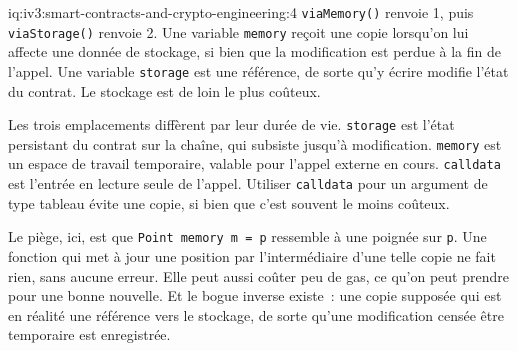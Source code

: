 \begin{solution}{iq:iv3:smart-contracts-and-crypto-engineering:4}
\texttt{viaMemory()} renvoie 1, puis \texttt{viaStorage()} renvoie 2. Une variable \texttt{memory} reçoit une copie lorsqu'on lui affecte une donnée de stockage, si bien que la modification est perdue à la fin de l'appel. Une variable \texttt{storage} est une référence, de sorte qu'y écrire modifie l'état du contrat. Le stockage est de loin le plus coûteux.

Les trois emplacements diffèrent par leur durée de vie. \texttt{storage} est l'état persistant du contrat sur la chaîne, qui subsiste jusqu'à modification. \texttt{memory} est un espace de travail temporaire, valable pour l'appel externe en cours. \texttt{calldata} est l'entrée en lecture seule de l'appel. Utiliser \texttt{calldata} pour un argument de type tableau évite une copie, si bien que c'est souvent le moins coûteux.

Le piège, ici, est que \texttt{Point memory m = p} ressemble à une poignée sur \texttt{p}. Une fonction qui met à jour une position par l'intermédiaire d'une telle copie ne fait rien, sans aucune erreur. Elle peut aussi coûter peu de gas, ce qu'on peut prendre pour une bonne nouvelle. Et le bogue inverse existe~: une copie supposée qui est en réalité une référence vers le stockage, de sorte qu'une modification censée être temporaire est enregistrée.

\end{solution}

